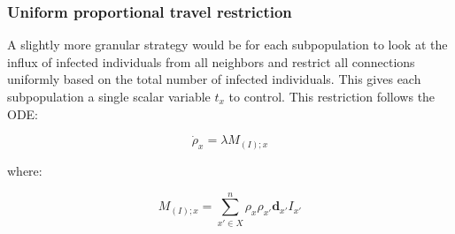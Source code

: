 \subsubsection{Uniform proportional travel restriction}

A slightly more granular strategy would be for each subpopulation to look at the influx of infected individuals from all neighbors and restrict all connections uniformly based on the total number of infected individuals. This gives each subpopulation a single scalar variable $t_x$ to control. This restriction follows the ODE:

\begin{equation}
\dot{\rho}_x = \lambda M_{(I);x}
\end{equation}

where:

\begin{equation}
M_{(I);x} = \sum_{x' \in X}^{n} \rho_x \rho_{x'} \mathbf{d}_{x'} I_{x'}
\end{equation}
\usetikzlibrary{arrows.meta, positioning, calc}

